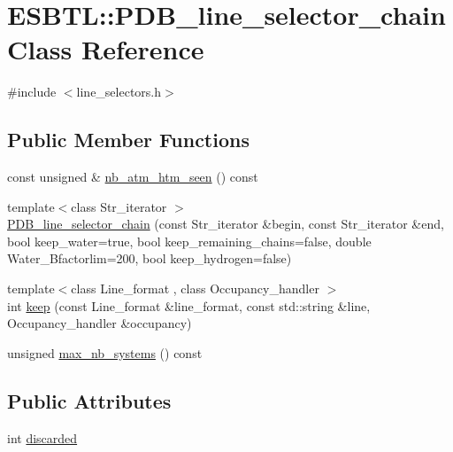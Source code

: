 \hypertarget{classESBTL_1_1PDB__line__selector__chain}{}\section{E\+S\+B\+TL\+:\+:P\+D\+B\+\_\+line\+\_\+selector\+\_\+chain Class Reference}
\label{classESBTL_1_1PDB__line__selector__chain}


{\ttfamily \#include $<$line\+\_\+selectors.\+h$>$}

\subsection*{Public Member Functions}
\begin{DoxyCompactItemize}
\item 
const unsigned \& \hyperlink{classESBTL_1_1PDB__line__selector__chain_ad55fd6ce49a865fcb1ae7efb0c2362e4}{nb\+\_\+atm\+\_\+htm\+\_\+seen} () const
\item 
{\footnotesize template$<$class Str\+\_\+iterator $>$ }\\\hyperlink{classESBTL_1_1PDB__line__selector__chain_a3ab3696d31d1850c53baa12e82f121fd}{P\+D\+B\+\_\+line\+\_\+selector\+\_\+chain} (const Str\+\_\+iterator \&begin, const Str\+\_\+iterator \&end, bool keep\+\_\+water=true, bool keep\+\_\+remaining\+\_\+chains=false, double Water\+\_\+\+Bfactorlim=200, bool keep\+\_\+hydrogen=false)
\item 
{\footnotesize template$<$class Line\+\_\+format , class Occupancy\+\_\+handler $>$ }\\int \hyperlink{classESBTL_1_1PDB__line__selector__chain_acb2d67076cfdcbc254b42af78f15fc9c}{keep} (const Line\+\_\+format \&line\+\_\+format, const std\+::string \&line, Occupancy\+\_\+handler \&occupancy)
\item 
unsigned \hyperlink{classESBTL_1_1PDB__line__selector__chain_a1e8aee358ba3e5df80e2aeecb83ca89f}{max\+\_\+nb\+\_\+systems} () const
\end{DoxyCompactItemize}
\subsection*{Public Attributes}
\begin{DoxyCompactItemize}
\item 
int \hyperlink{classESBTL_1_1PDB__line__selector__chain_af8fdc12b87a64be02a6207d919183719}{discarded}
\end{DoxyCompactItemize}


